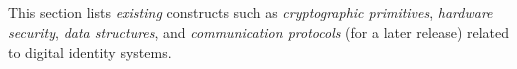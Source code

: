 \subsection{\sfi}
\label{sub:foundations}

This section lists \emph{existing} constructs such as \emph{cryptographic primitives}, \emph{hardware security}, \emph{data structures}, and \emph{communication protocols} (for a later release) related to digital identity systems.



